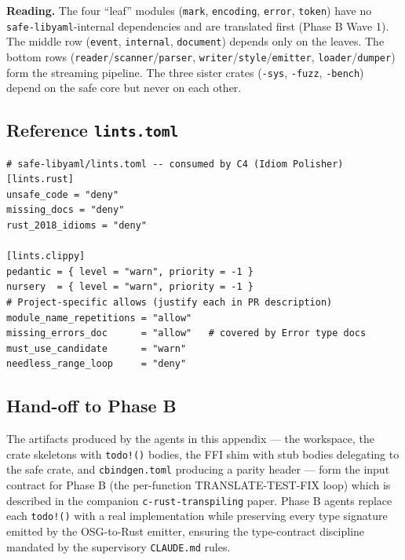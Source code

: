 \documentclass[12pt]{article}
\theoremstyle{definition}
\theoremstyle{remark}
\begin{document}
\begin{center}
\end{center}

\noindent\textbf{Reading.} The four ``leaf'' modules (\texttt{mark},
\texttt{encoding}, \texttt{error}, \texttt{token}) have no
\texttt{safe-libyaml}-internal dependencies and are translated first
(Phase B Wave 1). The middle row (\texttt{event}, \texttt{internal},
\texttt{document}) depends only on the leaves. The bottom rows
(\texttt{reader}/\texttt{scanner}/\texttt{parser},
\texttt{writer}/\texttt{style}/\texttt{emitter},
\texttt{loader}/\texttt{dumper}) form the streaming pipeline. The three
sister crates (\texttt{-sys}, \texttt{-fuzz}, \texttt{-bench}) depend on
the safe core but never on each other.

\subsection{Reference \texttt{lints.toml}}

\begin{lstlisting}[language={}]
# safe-libyaml/lints.toml -- consumed by C4 (Idiom Polisher)
[lints.rust]
unsafe_code = "deny"
missing_docs = "deny"
rust_2018_idioms = "deny"

[lints.clippy]
pedantic = { level = "warn", priority = -1 }
nursery  = { level = "warn", priority = -1 }
# Project-specific allows (justify each in PR description)
module_name_repetitions = "allow"
missing_errors_doc      = "allow"   # covered by Error type docs
must_use_candidate      = "warn"
needless_range_loop     = "deny"
\end{lstlisting}

\subsection{Hand-off to Phase B}

The artifacts produced by the agents in this appendix --- the workspace, the
crate skeletons with \texttt{todo!()} bodies, the FFI shim with stub bodies
delegating to the safe crate, and \texttt{cbindgen.toml} producing a
parity header --- form the input contract for Phase B (the per-function
TRANSLATE-TEST-FIX loop) which is described in the companion
\texttt{c-rust-transpiling} paper. Phase B agents replace each
\texttt{todo!()} with a real implementation while preserving every type
signature emitted by the OSG-to-Rust emitter, ensuring the type-contract
discipline mandated by the supervisory \texttt{CLAUDE.md} rules.
\end{document}
